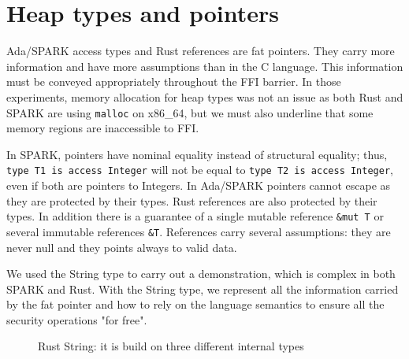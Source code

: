 \documentclass[nomenclature, english, bibtex]{kththesis}
\newcommand{\inlinecode}[1]{\texttt{#1}}
\begin{document}
\section{Heap types and pointers}



Ada/SPARK access types and Rust references are fat pointers. They carry more information and have more assumptions than in the C language. This information must be conveyed appropriately throughout the FFI barrier. In those experiments, memory allocation for heap types was not an issue as both Rust\cite{santos_investigating_2022} and SPARK are using \texttt{malloc} on x86\_64, but we must also underline that some memory regions are inaccessible to \gls{FFI}.


In SPARK, pointers have nominal equality instead of structural equality; thus, \inlinecode{type T1 is access Integer} will not be equal to \inlinecode{type T2 is access Integer}, even if both are pointers to Integers. In Ada/SPARK pointers cannot escape as they are protected by their types. Rust references are also protected by their types. In addition there is a guarantee of a single mutable reference \texttt{\&mut T} or several immutable references \texttt{\&T}. References carry several assumptions: \first they are never null and \Second they points always to valid data.

We used the String type to carry out a demonstration, which is complex in both SPARK and Rust. With the String type, we represent all the information carried by the fat pointer and how to rely on the language semantics to ensure all the security operations "for free".



\begin{figure}[ht!]
    \centering
  \caption{Rust String: it is build on three different internal types}
  \label{fig:ruststring}
\end{figure}
\end{document}
